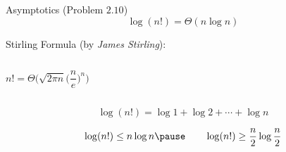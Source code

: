 \begin{frame}{}
  \begin{exampleblock}{Asymptotics (Problem $2.10$)}
    \[
      \log(n!) = \Theta(n \log n)
    \]
  \end{exampleblock}

  \pause
  \vspace{0.30cm}
  \begin{alertblock}{Stirling Formula (by {\it James Stirling}):}
    \begin{columns}
	\[
	  n! = \Theta\Big(\sqrt{2 \pi n} \Big(\frac{n}{e}\Big)^{n}\Big)
	\]
    \end{columns}
  \end{alertblock}

  \pause
  \vspace{0.30cm}
  \[
    \log (n!) = \log 1 + \log 2 + \cdots + \log n
  \]

  \pause
  \[
    \log (n!) \le n \log n \pause \qquad \log (n!) \ge \frac{n}{2} \log \frac{n}{2}
  \]
\end{frame}
